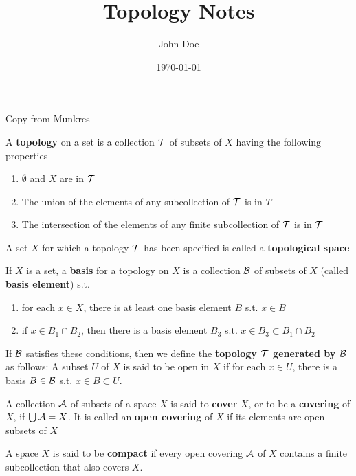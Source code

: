 \documentclass[11pt]{article}
\author{John Doe}
\date{\today}
\title{Topology Notes}
\begin{document}
\maketitle
Copy from Munkres

\begin{definition}
A \textbf{topology} on a set is a collection \(\mathcal{T}\) of subsets of \(X\) having the following properties
\begin{enumerate}
\item \(\emptyset\) and \(X\) are in \(\mathcal{T}\)
\item The union of the elements of any subcollection of \(\mathcal{T}\) is in \(T\)
\item The intersection of the elements of any finite subcollection of \(\mathcal{T}\) is in \(\mathcal{T}\)
\end{enumerate}


A set \(X\) for which a topology \(\mathcal{T}\) has been specified is called a \textbf{topological space}
\end{definition}

\begin{definition}[]
If \(X\) is a set, a \textbf{basis} for a topology on \(X\) is a collection \(\mathcal{B}\) of subsets of \(X\)
(called \textbf{basis element}) s.t.
\begin{enumerate}
\item for each \(x\in X\), there is at least one basis element \(B\) s.t. \(x\in B\)
\item if \(x\in B_1\cap B_2\), then there is a basis element \(B_3\) s.t. \(x\in B_3\subset B_1\cap B_2\)
\end{enumerate}


If \(\mathcal{B}\) satisfies these conditions, then we define the \textbf{topology \(\mathcal{T}\) generated by \(\mathcal{B}\)} as
follows: A subset \(U\) of \(X\) is said to be open in \(X\) if for each \(x\in U\), there is a
basis \(B\in\mathcal{B}\) s.t. \(x\in B\subset U\).
\end{definition}

\begin{definition}[]
A collection \(\mathcal{A}\) of subsets of a space \(X\) is said to \textbf{cover} \(X\), or to be a \textbf{covering}
of \(X\), if \(\bigcup\mathcal{A}=X\). It is called an \textbf{open covering} of \(X\) if its elements are open subsets of \(X\)
\end{definition}

\begin{definition}[]
A space \(X\) is said to be \textbf{compact} if every open covering \(\mathcal{A}\) of \(X\) contains a finite
subcollection that also covers \(X\).
\end{definition}
\end{document}
